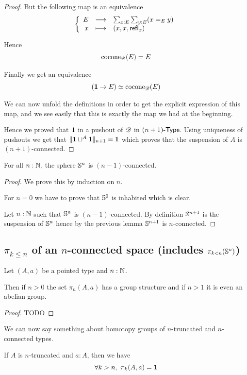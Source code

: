 \begin{proof}
  But the following map is an equivalence
  \[\function{E}{\sum_{x:E}\sum_{y:E}(x=_Ey)}{x}{(x,x,\refl{x})}\]

  Hence
  \[\cocone{\Ddiag}{E}=E\]

  Finally we get an equivalence
  \[(\unit\to{}E)\simeq\cocone{\Ddiag}{E}\]

  We can now unfold the definitions in order to get the explicit expression of
  this map, and we see easily that this is exactly the map we had at the
  beginning.

  \bigskip

  Hence we proved that $\unit$ in a pushout of $\Ddiag$ in $\typelep{n+1}$. Using
  uniqueness of pushouts we get that $\trunc{n+1}{\unit\sqcup^A\unit}=\unit$
  which proves that the suspension of $A$ is $(n+1)$-connected.
\end{proof}

\begin{cor} \label{cor:sn-connected}
  For all $n:\N$, the sphere $\Sn^n$ is $(n-1)$-connected.
\end{cor}

\begin{proof}
  We prove this by induction on $n$.

  For $n=0$ we have to prove that $\Sn^0$ is inhabited which is clear.

  Let $n:\N$ such that $\Sn^n$ is $(n-1)$-connected. By definition $\Sn^{n+1}$
  is the suspension of $\Sn^n$ hence by the previous lemma $\Sn^{n+1}$ is
  $n$-connected.
\end{proof}

\subsection{$\pi_{k \le n}$ of an $n$-connected space (includes $\pi_{k < n}(\Sn ^n)$)}

\begin{lem}
  Let $(A,a)$ be a pointed type and $n:\N$.

  Then if $n>0$ the set $\pi_n(A,a)$ has a group structure and if $n>1$ it is
  even an abelian group.
\end{lem}

\begin{proof}
  TODO
\end{proof}

We can now say something about homotopy groups of $n$-truncated and
$n$-connected types.

\begin{lem}
  If $A$ is $n$-truncated and $a:A$, then we have
  \[\forall k>n,\ \pi_k(A,a)=\unit\]
\end{lem}

